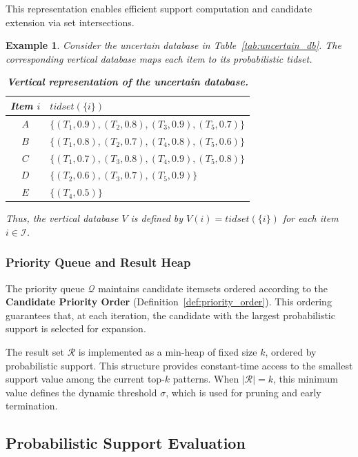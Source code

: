 \documentclass[10pt,letterpaper]{article}
\newtheorem{example}{Example}[section]
\newcounter{example}
\begin{document}
This representation enables efficient support computation and candidate extension via set intersections.

\begin{example}
\label{ex:vertical_db}
Consider the uncertain database in Table~\ref{tab:uncertain_db}. The corresponding vertical database maps each item to its probabilistic tidset.

\begin{table}[!ht]
\caption{\bf Vertical representation of the uncertain database.}
\label{tab:vertical_db}
\centering
\begin{tabular}{c l}
\hline
\textbf{Item $i$} & $\mathit{tidset}(\{i\})$ \\
\hline
$A$ & $\{(T_1,0.9),(T_2,0.8),(T_3,0.9),(T_5,0.7)\}$ \\
$B$ & $\{(T_1,0.8),(T_2,0.7),(T_4,0.8),(T_5,0.6)\}$ \\
$C$ & $\{(T_1,0.7),(T_3,0.8),(T_4,0.9),(T_5,0.8)\}$ \\
$D$ & $\{(T_2,0.6),(T_3,0.7),(T_5,0.9)\}$ \\
$E$ & $\{(T_4,0.5)\}$ \\
\hline
\end{tabular}
\end{table}

Thus, the vertical database $V$ is defined by $V(i)=\mathit{tidset}(\{i\})$ for each item $i\in\mathcal{I}$.
\end{example}

\subsubsection*{Priority Queue and Result Heap}

The priority queue $\mathcal{Q}$ maintains candidate itemsets ordered according to the \textbf{Candidate Priority Order} (Definition~\ref{def:priority_order}). This ordering guarantees that, at each iteration, the candidate with the largest probabilistic support is selected for expansion. 

The result set $\mathcal{R}$ is implemented as a min-heap of fixed size $k$, ordered by probabilistic support. This structure provides constant-time access to the smallest support value among the current top-$k$ patterns. When $|\mathcal{R}| = k$, this minimum value defines the dynamic threshold $\sigma$, which is used for pruning and early termination.


\subsection*{Probabilistic Support Evaluation}
\label{subsec:support_computation}
\end{document}
